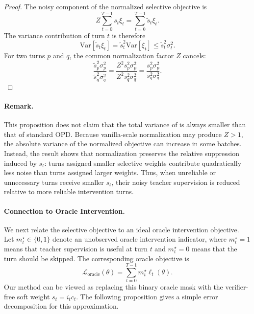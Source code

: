 \begin{proof}
The noisy component of the normalized selective objective is
\begin{equation}
    Z\sum_{t=0}^{T-1}s_t\xi_t
    =
    \sum_{t=0}^{T-1}\widetilde{s}_t\xi_t.
\end{equation}
The variance contribution of turn $t$ is therefore
\begin{equation}
    \mathrm{Var}[\widetilde{s}_t\xi_t]
    =
    \widetilde{s}_t^2\mathrm{Var}[\xi_t]
    \leq
    \widetilde{s}_t^2\sigma_t^2.
\end{equation}
For two turns $p$ and $q$, the common normalization factor $Z$ cancels:
\begin{equation}
    \frac{\widetilde{s}_p^2 \sigma_p^2}
         {\widetilde{s}_q^2 \sigma_q^2}
    =
    \frac{Z^2s_p^2 \sigma_p^2}
         {Z^2s_q^2 \sigma_q^2}
    =
    \frac{s_p^2 \sigma_p^2}
         {s_q^2 \sigma_q^2}.
\end{equation}
\end{proof}

\paragraph{Remark.}
This proposition does not claim that the total variance of \ours is always smaller than that of standard OPD.
%
Because vanilla-scale normalization may produce $Z>1$, the absolute variance of the normalized objective can increase in some batches.
%
Instead, the result shows that normalization preserves the relative suppression induced by $s_t$: turns assigned smaller selective weights contribute quadratically less noise than turns assigned larger weights.
%
Thus, when unreliable or unnecessary turns receive smaller $s_t$, their noisy teacher supervision is reduced relative to more reliable intervention turns.
%

\paragraph{Connection to Oracle Intervention.}
We next relate the selective objective to an ideal oracle intervention objective.
%
Let
$
    m_t^\star \in \{0,1\}$
denote an unobserved oracle intervention indicator, where $m_t^\star=1$ means that teacher supervision is useful at turn $t$ and $m_t^\star=0$ means that the turn should be skipped.
%
The corresponding oracle objective is
\begin{equation}
    \mathcal{L}_{\mathrm{oracle}}(\theta)
    =
    \sum_{t=0}^{T-1}
    m_t^\star \ell_t(\theta).
\end{equation}
%
Our method can be viewed as replacing this binary oracle mask with the verifier-free soft weight $s_t=i_tc_t$.
%
The following proposition gives a simple error decomposition for this approximation.

